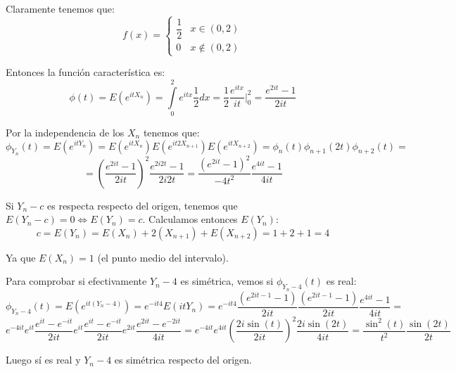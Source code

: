 \documentclass[openany]{book}
\begin{document}
\begin{exercise}
    Claramente tenemos que:
    $$ f(x)= \left\{
    \begin{array}{ll}
        \dfrac{1}{2} & x \in (0,2)\\ 
        0 & x \not \in (0,2)
    \end{array}
    \right. $$

    Entonces la función característica es:
    $$ \phi(t) = E(e^{itX_n}) = \int\limits_{0}^{2}e^{itx}\dfrac{1}{2}dx = \dfrac{1}{2} \dfrac{e^{itx}}{it} \Biggr|_{0}^{2} = \dfrac{e^{2it}-1}{2it} $$

    Por la independencia de los $ X_n $ tenemos que:
    $$ \phi_{Y_n}(t) = E(e^{itY_n}) = E(e^{itX_n})E(e^{it2X_{n+1}})E(e^{itX_{n+2}}) = \phi_n(t)\phi_{n+1}(2t)\phi_{n+2}(t) =$$ 
     $$ =  \left(\dfrac{e^{2it}-1}{2it}\right)^2 \dfrac{e^{2i2t}-1}{2i2t} = \dfrac{(e^{2it}-1)^2}{-4t^2} \dfrac{e^{4it}-1}{4it}$$

    Si $ Y_n-c $ es respecta respecto del origen, tenemos que $ E(Y_n-c)=0 \iff E(Y_n) = c $. Calculamos entonces $ E(Y_n) $:
    $$ c = E(Y_n) = E(X_n) +2(X_{n+1}) + E(X_{n+2}) = 1+2+1=4 $$

    Ya que $ E(X_n) = 1 $ (el punto medio del intervalo).

    Para comprobar si efectivamente $ Y_n-4 $ es simétrica, vemos si $ \phi_{Y_n-4}(t) $ es real:
    $$ \phi_{Y_n-4}(t) = E(e^{it(Y_n-4)}) = e^{-it4}E(itY_n) = e^{-it 4} \dfrac{(e^{2it-1}-1)}{2it} \dfrac{(e^{2it-1}-1)}{2it} \dfrac{e^{4it}-1}{4it} =$$ 
     $$ e^{-4it} e^{it} \dfrac{e^{it}-e^{-it}}{2it} e^{it}\dfrac{e^{it}-e^{-it}}{2it} e^{2it} \dfrac{e^{2it}-e^{-2it}}{4it}  = e^{-4it}e^{4it} \left( \dfrac{2i \sin(t)}{2it} \right)^2 \dfrac{2i \sin(2t)}{4it} = \dfrac{\sin^2(t)}{t^2} \dfrac{\sin(2t)}{2t} $$

    Luego sí es real y $ Y_n-4 $ es simétrica respecto del origen.

\end{exercise}
\end{document}

